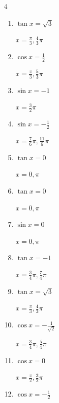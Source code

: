 \begin{multicols}{4}
\begin{enumerate}
  \item $\displaystyle \tan{x}  = \sqrt{3}$

        $\displaystyle x = \frac{\pi}{3} , \frac{4}{3}\pi$

  \item $\displaystyle \cos{x}  = \frac{1}{2}$

        $\displaystyle x = \frac{\pi}{3} , \frac{5}{3}\pi$

  \item $\displaystyle \sin{x}  = -1$

        $\displaystyle x = \frac{3}{2}\pi$

  \item $\displaystyle \sin{x}  = -\frac{1}{2}$

        $\displaystyle x = \frac{7}{6}\pi , \frac{11}{6}\pi$

  \item $\displaystyle \tan{x}  = 0$

        $\displaystyle x = 0 , \pi$

  \item $\displaystyle \tan{x}  = 0$

        $\displaystyle x = 0 , \pi$

  \item $\displaystyle \sin{x}  = 0$

        $\displaystyle x = 0 , \pi$

  \item $\displaystyle \tan{x}  = -1$

        $\displaystyle x = \frac{3}{4}\pi , \frac{7}{4}\pi$

  \item $\displaystyle \tan{x}  = \sqrt{3}$

        $\displaystyle x = \frac{\pi}{3} , \frac{4}{3}\pi$

  \item $\displaystyle \cos{x}  = -\frac{1}{\sqrt{2}}$

        $\displaystyle x = \frac{3}{4}\pi , \frac{5}{4}\pi$

  \item $\displaystyle \cos{x}  = 0$

        $\displaystyle x = \frac{\pi}{2} , \frac{3}{2}\pi$

\columnbreak %

\resetques

  \item $\displaystyle \cos{x}  = -\frac{1}{2}$


\end{enumerate}
\end{multicols}
